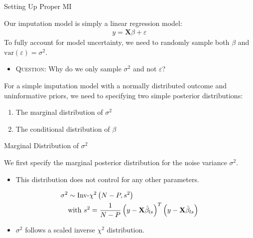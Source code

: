 \documentclass[table]{beamer}
\begin{document}
\begin{frame}{Setting Up Proper MI}
  
  Our imputation model is simply a linear regression model:
  \begin{align*}
    y = \mathbf{X} \beta + \varepsilon
  \end{align*}
  To fully account for model uncertainty, we need to randomly sample
  both $\beta$ and $\text{var}(\varepsilon) = \sigma^2$.
  \begin{itemize}
  \item \textsc{Question:} Why do we only sample $\sigma^2$ and not
    $\varepsilon$?
  \end{itemize}
  \pause
  \vspace{12pt}
  For a simple imputation model with a normally distributed
  outcome and uninformative priors, we need to specifying two
  simple posterior distributions:\\
  \begin{enumerate}
    \item The marginal distribution of $\sigma^2$
    \item The conditional distribution of $\beta$ 
  \end{enumerate}
  
\end{frame}


\begin{frame}{Marginal Distribution of $\sigma^2$}
 
  We first specify the marginal posterior distribution for the noise variance $\sigma^2$.
  \begin{itemize}
  \item This distribution does not control for any other parameters.
  \end{itemize}
  \begin{align}
    \sigma^2 &\sim \text{Inv-}\chi^2 \left(N - P, s^2 \right) \label{sigma2PosteriorEq}\\
    &\text{with } s^2 = \frac{1}{N - P} \left( y - \mathbf{X}\hat{\beta}_{ls} \right)^T \left( y - \mathbf{X}\hat{\beta}_{ls} \right) \notag
  \end{align}
  \begin{itemize}
  \item $\sigma^2$ follows a scaled inverse $\chi^2$ distribution.
  \end{itemize}

\end{frame}
\end{document}
